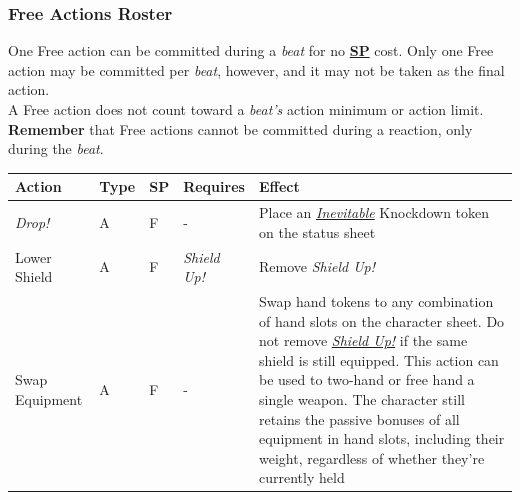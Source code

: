 \documentclass[12pt]{article}
\newcommand{\refto}[1]{\hyperlink{#1}{\textbf{#1}}}
\newcommand{\reftoit}[1]{\hyperlink{#1}{\emph{#1}}}
\begin{document}
\pagebreak

\subsubsection{Free Actions Roster}
One Free action can be committed during a \emph{beat} for no \refto{SP} cost. Only one Free action may be committed per \emph{beat}, however, and it may not be taken as the final action.\\
A Free action does not count toward a \emph{beat’s} action minimum or action limit.\\
\textbf{Remember} that Free actions cannot be committed during a reaction, only during the \emph{beat}.\\
\begin{center}
\begin{tabularx}{\textwidth}{p{}p{}p{}p{}p{}}
\hline
\rowcolor{white} \textbf{Action} & \textbf{Type} & \textbf{SP} & \textbf{Requires} & \textbf{Effect}\setcounter{rownum}{0}\\
\hline
\emph{Drop!} & A & F & - & Place an \reftoit{Inevitable} Knockdown token on the status sheet\\
Lower Shield & A & F & \emph{Shield Up!} & Remove \emph{Shield Up!}\\
Swap Equipment & A & F & - & Swap hand tokens to any combination of hand slots on the character sheet.\newline
Do not remove \reftoit{Shield Up!} if the same shield is still equipped.\newline
This action can be used to two-hand or free hand a single weapon.\newline
The character still retains the passive bonuses of all equipment in hand slots, including their weight, regardless of whether they’re currently held\\
\hline
\end{tabularx}
\end{center}

\pagebreak
\end{document}
